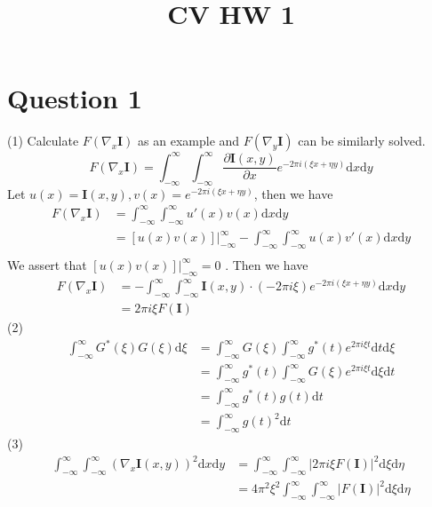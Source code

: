 \documentclass{article}
\begin{document}
\title{CV HW 1}
\maketitle
\section{Question 1}
(1) Calculate $F(\nabla_x \mathbf{I})$ as an example and $F(\nabla_y \mathbf{I})$ can be similarly solved. \\
\begin{equation*}
    F(\nabla_x \mathbf{I}) = \int_{-\infty}^{\infty} \int_{-\infty}^{\infty} \frac{\partial \mathbf{I}(x, y)}{\partial x} e^{-2\pi i (\xi x + \eta y)} \mathrm{d}x\mathrm{d}y
\end{equation*}
Let $u(x) = \mathbf{I}(x, y), v(x) = e^{-2\pi i (\xi x + \eta y)}$, then we have
\begin{align*}
    F(\nabla_x \mathbf{I})
    &= \int_{-\infty}^{\infty} \int_{-\infty}^{\infty} u'(x) v(x) \mathrm{d}x\mathrm{d}y \\
    &= [u(x)v(x)] \Big|_{-\infty}^{\infty} - \int_{-\infty}^{\infty} \int_{-\infty}^{\infty} u(x) v'(x) \mathrm{d}x\mathrm{d}y \\
\end{align*}
We assert that $[u(x)v(x)] \Big|_{-\infty}^{\infty} = 0$ . Then we have
\begin{align*}
    F(\nabla_x \mathbf{I})
    &= -\int_{-\infty}^{\infty} \int_{-\infty}^{\infty} \mathbf{I}(x, y) \cdot (-2\pi i \xi) e^{-2\pi i (\xi x + \eta y)} \mathrm{d}x \mathrm{d}y \\
    &= 2\pi i \xi F(\mathbf{I})
\end{align*}
(2) 
\begin{align*}
    \int_{-\infty}^{\infty} G^*(\xi) G(\xi) \mathrm{d}\xi 
    &= \int_{-\infty}^{\infty} G(\xi) \int_{-\infty}^{\infty} g^*(t) e^{2\pi i \xi t} \mathrm{d}t \mathrm{d}\xi \\
    &= \int_{-\infty}^{\infty} g^*(t) \int_{-\infty}^{\infty} G(\xi) e^{2\pi i \xi t} \mathrm{d}\xi \mathrm{d}t \\
    &= \int_{-\infty}^{\infty} g^*(t) g(t) \mathrm{d}t \\
    &= \int_{-\infty}^{\infty} g(t)^2 \mathrm{d}t
\end{align*}
(3)
\begin{align*}
    \int_{-\infty}^{\infty} \int_{-\infty}^{\infty} (\nabla_x \mathbf{I}(x, y))^2 \mathrm{d}x\mathrm{d}y
    &= \int_{-\infty}^{\infty} \int_{-\infty}^{\infty} |2\pi i \xi F(\mathbf{I})|^2 \mathrm{d}\xi \mathrm{d}\eta \\
    &= 4\pi^2 \xi^2 \int_{-\infty}^{\infty} \int_{-\infty}^{\infty} |F(\mathbf{I})|^2 \mathrm{d}\xi \mathrm{d}\eta
\end{align*}
\end{document}
